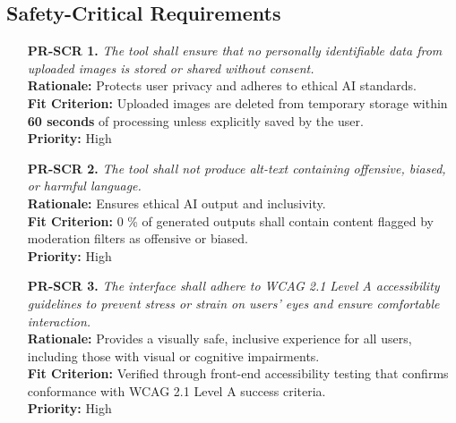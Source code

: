 \documentclass[12pt]{article}
\begin{document}
\subsection{Safety-Critical Requirements}
\begin{itemize}
    \item[\textbf{PR-SCR 1.}] \textit{The tool shall ensure that no personally identifiable data from uploaded images is stored or shared without consent.}\\
    \textbf{Rationale:} Protects user privacy and adheres to ethical AI standards.\\
    \textbf{Fit Criterion:} Uploaded images are deleted from temporary storage within \textbf{60 seconds} of processing unless explicitly saved by the user.\\
    \textbf{Priority:} High

    \item[\textbf{PR-SCR 2.}] \textit{The tool shall not produce alt-text containing offensive, biased, or harmful language.}\\
    \textbf{Rationale:} Ensures ethical AI output and inclusivity.\\
    \textbf{Fit Criterion:} 0 \% of generated outputs shall contain content flagged by moderation filters as offensive or biased.\\
    \textbf{Priority:} High

    \item[\textbf{PR-SCR 3.}] \textit{The interface shall adhere to WCAG 2.1 Level A accessibility guidelines to prevent stress or strain on users’ eyes and ensure comfortable interaction.}\\
    \textbf{Rationale:} Provides a visually safe, inclusive experience for all users, including those with visual or cognitive impairments.\\
    \textbf{Fit Criterion:} Verified through front-end accessibility testing that confirms conformance with WCAG 2.1 Level A success criteria.\\
    \textbf{Priority:} High
\end{itemize}
\end{document}
